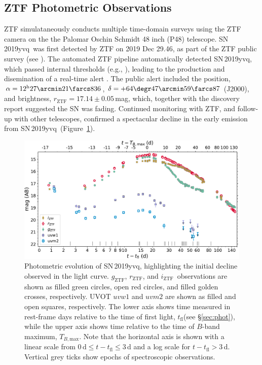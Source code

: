 \documentclass[twocolumn]{aastex63}
\newcommand{\rztf}{$r_\mathrm{ZTF}$}
\newcommand{\gztf}{$g_\mathrm{ZTF}$}
\newcommand{\iztf}{$i_\mathrm{ZTF}$}
\newcommand{\tfl}{$t_\mathrm{fl}$}
\newcommand{\tbmax}{$T_{B,\mathrm{max}}$}
\newcommand{\sn}{SN\,2019yvq}
\begin{document}
\subsection{ZTF Photometric Observations}

ZTF simulataneously conducts multiple time-domain surveys using the ZTF
camera on the the Palomar Oschin Schmidt 48 inch (P48) telescope. \sn\ was
first detected by ZTF on 2019 Dec 29.46, as part of the ZTF public survey
(see \citealt{Bellm19a}). The automated ZTF pipeline \citep{Masci19}
automatically detected \sn, which passed internal thresholds (e.g.,
\citealt{Mahabal19}), leading to the production and disemination of a
real-time alert \citep{Patterson19}. The public alert included the position,
$\alpha = 12^{\mathrm{h}}27\arcmin21\farcs836$, $\delta =
+64\degr47\arcmin59\farcs87$ (J2000), and brightness, \rztf$ =
17.14\pm0.05$\,mag, which, together with the \citet{Itagaki19} discovery
report suggested the SN was fading. Continued monitoring with ZTF, and
follow-up with other telescopes, confirmed a spectacular decline in the early
emission from \sn\ (Figure~\ref{fig:p48}).

\begin{figure}
    \centering
    \includegraphics[width=6in]{./figures/P48_lc.pdf}
    \caption{Photometric evolution of \sn, highlighting the initial decline
    observed in the light curve. \gztf, \rztf, and \iztf\ observations are
    shown as filled green circles, open red circles, and filled golden
    crosses, respectively. UVOT $uvw1$ and $uvm2$ are shown as filled and
    open squares, respectively. The lower axis shows time measured in
    rest-frame days relative to the time of first light, \tfl (see
    \S\ref{sec:phot}), while the upper axis shows time relative to the time
    of $B$-band maximum, \tbmax. Note that the horizontal axis is shown with
    a linear scale from $0\,\mathrm{d} \le t - t_\mathrm{fl} \le 3$\,d and a
    log scale for $t - t_\mathrm{fl} > 3$\,d. Vertical grey ticks show
    epochs of spectroscopic observations.}
    \label{fig:p48}
\end{figure}
\end{document}

